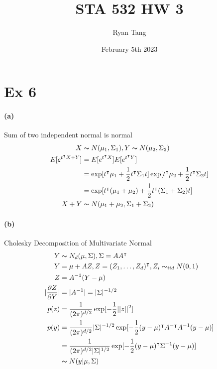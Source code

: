 \documentclass[11pt, letterpaper]{article}
\author{Ryan Tang}
\title{STA 532 HW 3}
\date{February 5th 2023}
\begin{document}
\maketitle

\section{Ex 6}
\paragraph{(a)} Sum of two independent normal is normal
\begin{align*}
    X &\thicksim N(\mu_1, \Sigma_1), Y\thicksim N(\mu_2, \Sigma_2) \\
    E[e^{t^{\intercal}{X+Y}}] &= E[e^{t^{\intercal}X}]E[e^{t^{\intercal}Y}] \\
        &= \exp[t^{\intercal}\mu_1 + \frac{1}{2}t^{\intercal}\Sigma_1 t] \exp[t^{\intercal}\mu_2 + \frac{1}{2}t^{\intercal}\Sigma_2 t] \\
        &= \exp[t^{\intercal}(\mu_1+\mu_2) + \frac{1}{2}t^{\intercal}(\Sigma_1+\Sigma_2) t] \\
    X+Y &\thicksim N(\mu_1+\mu_2, \Sigma_1+\Sigma_2)
\end{align*}
\paragraph{(b)} Cholesky Decomposition of Multivariate Normal
\begin{align*}
    Y &\thicksim N_d(\mu, \Sigma), \Sigma = AA^{\intercal} \\
    Y &= \mu + AZ, Z = (Z_1, \dots, Z_d)^{\intercal}, Z_i \thicksim_{iid} N(0, 1) \\
    Z &= A^{-1} (Y - \mu) \\
    |\frac{\partial Z}{\partial Y}| &= |A^{-1}| = |\Sigma|^{-1/2} \\
    p(z) &= \frac{1}{(2\pi)^{d/2}}\exp[-\frac{1}{2}||z||^2] \\
    p(y) &= \frac{1}{(2\pi)^{d/2}} |\Sigma|^{-1/2} \exp[-\frac{1}{2}(y-\mu)^{\intercal}A^{-\intercal}A^{-1}(y-\mu)] \\
        &= \frac{1}{(2\pi)^{d/2} |\Sigma|^{1/2}} \exp[-\frac{1}{2}(y-\mu)^{\intercal}\Sigma^{-1}(y-\mu)] \\
        &\thicksim N(y|\mu, \Sigma)
\end{align*}
\end{document}
